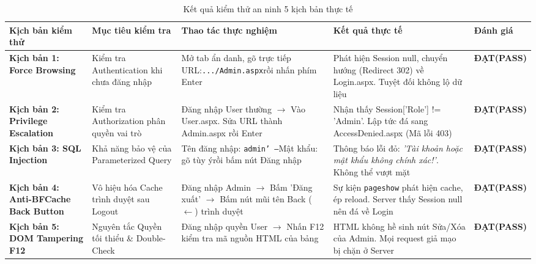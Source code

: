 \documentclass[12pt,a4paper]{report}
\begin{document}
\begin{table}[H]
\centering
\footnotesize
\renewcommand{\arraystretch}{1.25}
\begin{tabularx}{\textwidth}{>{\raggedright\arraybackslash}p{2.5cm} >{\raggedright\arraybackslash}p{2.3cm} >{\raggedright\arraybackslash}p{3.6cm} >{\raggedright\arraybackslash}X >{\centering\arraybackslash}p{1.8cm}}
\toprule
\textbf{Kịch bản kiểm thử} & \textbf{Mục tiêu kiểm tra} & \textbf{Thao tác thực nghiệm} & \textbf{Kết quả thực tế} & \textbf{Đánh giá} \\
\midrule
\textbf{Kịch bản 1: Force Browsing} & Kiểm tra Authentication khi chưa đăng nhập & Mở tab ẩn danh, gõ trực tiếp URL:\newline \texttt{.../Admin.aspx}\newline rồi nhấn phím Enter & Phát hiện Session null, chuyển hướng (Redirect 302) về Login.aspx. Tuyệt đối không lộ dữ liệu & \textbf{\color{green!60!black}ĐẠT\newline(PASS)} \\
\addlinespace
\textbf{Kịch bản 2: Privilege Escalation} & Kiểm tra Authorization phân quyền vai trò & Đăng nhập User thường $\rightarrow$ Vào User.aspx. Sửa URL thành Admin.aspx rồi Enter & Nhận thấy Session['Role'] != 'Admin'. Lập tức đá sang AccessDenied.aspx (Mã lỗi 403) & \textbf{\color{green!60!black}ĐẠT\newline(PASS)} \\
\addlinespace
\textbf{Kịch bản 3: SQL Injection} & Khả năng bảo vệ của Parameterized Query & Tên đăng nhập: \texttt{admin' --}\newline Mật khẩu: gõ tùy ý\newline rồi bấm nút Đăng nhập & Thông báo lỗi đỏ: \textit{'Tài khoản hoặc mật khẩu không chính xác!'}. Không thể vượt mặt & \textbf{\color{green!60!black}ĐẠT\newline(PASS)} \\
\addlinespace
\textbf{Kịch bản 4: Anti-BFCache Back Button} & Vô hiệu hóa Cache trình duyệt sau Logout & Đăng nhập Admin $\rightarrow$ Bấm 'Đăng xuất' $\rightarrow$ Bấm nút mũi tên Back ($\leftarrow$) trình duyệt & Sự kiện \texttt{pageshow} phát hiện cache, ép reload. Server thấy Session null nên đá về Login & \textbf{\color{green!60!black}ĐẠT\newline(PASS)} \\
\addlinespace
\textbf{Kịch bản 5: DOM Tampering F12} & Nguyên tắc Quyền tối thiểu \& Double-Check & Đăng nhập quyền User $\rightarrow$ Nhấn F12 kiểm tra mã nguồn HTML của bảng & HTML không hề sinh nút Sửa/Xóa của Admin. Mọi request giả mạo bị chặn ở Server & \textbf{\color{green!60!black}ĐẠT\newline(PASS)} \\
\bottomrule
\end{tabularx}
\caption{Kết quả kiểm thử an ninh 5 kịch bản thực tế}\label{tab:test_cases}
\end{table}
\end{document}
